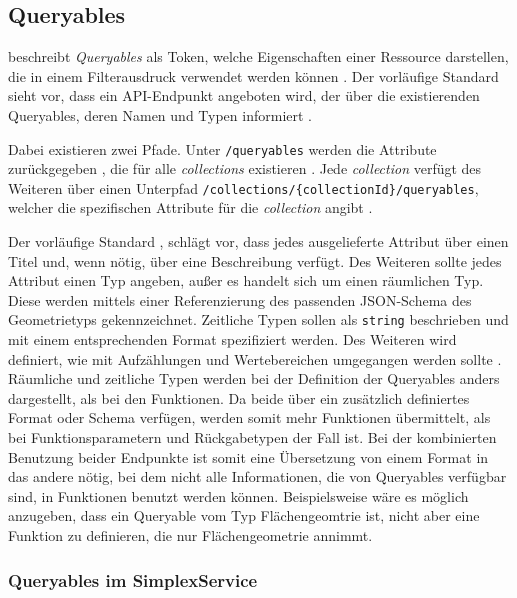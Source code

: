 \subsection{Queryables}
\label{sec:queryables}

 beschreibt \textit{Queryables} als Token, welche Eigenschaften einer Ressource darstellen, die in einem Filterausdruck verwendet werden können . Der vorläufige Standard sieht vor, dass ein \ac{API}-Endpunkt angeboten wird, der über die existierenden Queryables, deren Namen und Typen informiert
.

Dabei existieren zwei Pfade. Unter \texttt{/queryables} werden die Attribute zurückgegeben , die für alle \textit{collections} existieren . Jede \textit{collection} verfügt des Weiteren über einen Unterpfad \texttt{/collections/\{collectionId\}/queryables}, welcher die spezifischen Attribute für die \textit{collection} angibt .

Der vorläufige Standard , schlägt vor, dass jedes ausgelieferte Attribut über einen Titel und, wenn nötig, über eine Beschreibung verfügt. Des Weiteren sollte jedes Attribut einen Typ angeben, außer es handelt sich um einen räumlichen Typ. Diese werden mittels einer Referenzierung des passenden \ac{JSON}-Schema des Geometrietyps gekennzeichnet. Zeitliche Typen sollen als \texttt{string} beschrieben und mit einem entsprechenden Format spezifiziert werden. Des Weiteren wird definiert, wie mit Aufzählungen und Wertebereichen umgegangen werden sollte . Räumliche und zeitliche Typen werden bei der Definition der Queryables anders dargestellt, als bei den Funktionen. Da beide über ein zusätzlich definiertes Format oder Schema verfügen, werden somit mehr Funktionen übermittelt, als bei Funktionsparametern und Rückgabetypen der Fall ist. Bei der kombinierten Benutzung beider Endpunkte ist somit eine Übersetzung von einem Format in das andere nötig, bei dem nicht alle Informationen, die von Queryables verfügbar sind, in Funktionen benutzt werden können. Beispielsweise wäre es möglich anzugeben, dass ein Queryable vom Typ Flächengeomtrie ist, nicht aber eine Funktion zu definieren, die nur Flächengeometrie annimmt.

\subsubsection{Queryables im SimplexService}

